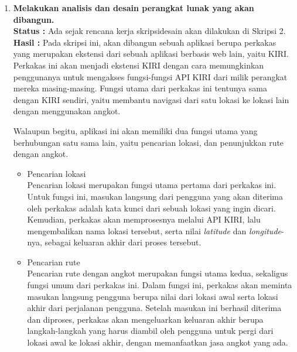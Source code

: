 \documentclass[a4paper,twoside]{article}
\begin{document}
\begin{enumerate}
\begin{lstlisting}[language=C, caption=Contoh sederhana penggunaan getopt-long, label=code:getopt-usage-long]
    	    case 'a':
	            if (verbose == 1) {
	                printf("Option '%s' was picked with argument '%s'.", long_options[option_index].name, optarg);
	            }
	            else
	                printf("a = %s", optarg);
	            putchar('\n');
	            break;

    	    case '?':
	            break;
	
	        default:
	            abort();
        }
    }

    if (optind < argc)
    {
        printf("Arguments passed without a corresponding option (argv): ");
        while (optind < argc) {
            printf("%s ", argv[optind++]);
        }
        putchar('\n');
    }

    exit(0);
}
\end{lstlisting}

		\item \textbf{Melakukan analisis dan desain perangkat lunak yang akan dibangun.}\\
		{\bf Status :} Ada sejak rencana kerja skripsi\textemdash desain akan dilakukan di Skripsi 2.\\
		{\bf Hasil :} Pada skripsi ini, akan dibangun sebuah aplikasi berupa perkakas \cl yang merupakan ekstensi dari sebuah aplikasi berbasis web lain, yaitu KIRI. Perkakas ini akan menjadi ekstensi KIRI dengan cara memungkinkan penggunanya untuk mengakses fungsi-fungsi API KIRI dari \cl milik perangkat mereka masing-masing. Fungsi utama dari perkakas ini tentunya sama dengan KIRI sendiri, yaitu membantu navigasi dari satu lokasi ke lokasi lain dengan menggunakan angkot.

Walaupun begitu, aplikasi ini akan memiliki dua fungsi utama yang berhubungan satu sama lain, yaitu pencarian lokasi, dan penunjukkan rute dengan angkot.

\begin{itemize}
	\item Pencarian lokasi\\
	Pencarian lokasi merupakan fungsi utama pertama dari perkakas ini. Untuk fungsi ini, masukan langsung dari pengguna yang akan diterima oleh perkakas adalah kata kunci dari sebuah lokasi yang ingin dicari. Kemudian, perkakas akan memprosesnya melalui API KIRI, lalu mengembalikan nama lokasi tersebut, serta nilai \textit{latitude} dan \textit{longitude}-nya, sebagai keluaran akhir dari proses tersebut.
	\item Pencarian rute\\
	Pencarian rute dengan angkot merupakan fungsi utama kedua, sekaligus fungsi umum dari perkakas ini. Dalam fungsi ini, perkakas akan meminta masukan langsung pengguna berupa nilai \latlon dari lokasi awal serta lokasi akhir dari perjalanan pengguna. Setelah masukan ini berhasil diterima dan diproses, perkakas akan mengeluarkan keluaran akhir berupa langkah-langkah yang harus diambil oleh pengguna untuk pergi dari lokasi awal ke lokasi akhir, dengan memanfaatkan jasa angkot yang ada.
\end{itemize}


\end{enumerate}
\end{document}
